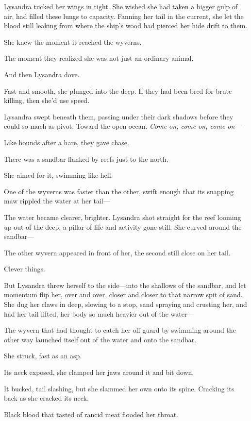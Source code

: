 Lysandra tucked her wings in tight. She wished she had taken a bigger gulp of air, had filled these lungs to capacity. Fanning her tail in the current, she let the blood still leaking from where the ship's wood had pierced her hide drift to them.

She knew the moment it reached the wyverns.

The moment they realized she was not just an ordinary animal.

And then Lysandra dove.

Fast and smooth, she plunged into the deep. If they had been bred for brute killing, then she'd use speed.

Lysandra swept beneath them, passing under their dark shadows before they could so much as pivot. Toward the open ocean. \emph{Come on, come on, come on}---

Like hounds after a hare, they gave chase.

There was a sandbar flanked by reefs just to the north.

She aimed for it, swimming like hell.

One of the wyverns was faster than the other, swift enough that its snapping maw rippled the water at her tail---

The water became clearer, brighter. Lysandra shot straight for the reef looming up out of the deep, a pillar of life and activity gone still. She curved around the sandbar---

The other wyvern appeared in front of her, the second still close on her tail.

Clever things.

But Lysandra threw herself to the side---into the shallows of the sandbar, and let momentum flip her, over and over, closer and closer to that narrow spit of sand. She dug her claws in deep, slowing to a stop, sand spraying and crusting her, and had her tail lifted, her body so much heavier out of the water---

The wyvern that had thought to catch her off guard by swimming around the other way launched itself out of the water and onto the sandbar.

She struck, fast as an asp.

Its neck exposed, she clamped her jaws around it and bit down.

It bucked, tail slashing, but she slammed her own onto its spine. Cracking its back as she cracked its neck.

Black blood that tasted of rancid meat flooded her throat.

